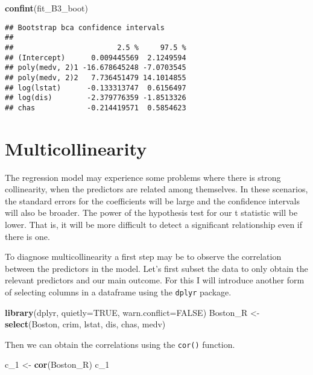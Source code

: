 \documentclass[
]{book}
\newenvironment{Shaded}{\begin{snugshade}}{\end{snugshade}}
\newcommand{\AttributeTok}[1]{\textcolor[rgb]{0.13,0.29,0.53}{#1}}
\newcommand{\ConstantTok}[1]{\textcolor[rgb]{0.56,0.35,0.01}{#1}}
\newcommand{\FunctionTok}[1]{\textcolor[rgb]{0.13,0.29,0.53}{\textbf{#1}}}
\newcommand{\NormalTok}[1]{#1}
\newcommand{\OtherTok}[1]{\textcolor[rgb]{0.56,0.35,0.01}{#1}}
\begin{document}
\begin{Shaded}
\begin{Highlighting}[]
\FunctionTok{confint}\NormalTok{(fit\_B3\_boot)}
\end{Highlighting}
\end{Shaded}

\begin{verbatim}
## Bootstrap bca confidence intervals
## 
##                        2.5 %     97.5 %
## (Intercept)      0.009445569  2.1249594
## poly(medv, 2)1 -16.678645248 -7.0703545
## poly(medv, 2)2   7.736451479 14.1014855
## log(lstat)      -0.133313747  0.6156497
## log(dis)        -2.379776359 -1.8513326
## chas            -0.214419571  0.5854623
\end{verbatim}

\section{Multicollinearity}\label{multicollinearity}

The regression model may experience some problems where there is strong collinearity, when the predictors are related among themselves. In these scenarios, the standard errors for the coefficients will be large and the confidence intervals will also be broader. The power of the hypothesis test for our t statistic will be lower. That is, it will be more difficult to detect a significant relationship even if there is one.

To diagnose multicollinearity a first step may be to observe the correlation between the predictors in the model. Let's first subset the data to only obtain the relevant predictors and our main outcome. For this I will introduce another form of selecting columns in a dataframe using the \texttt{dplyr} package.

\begin{Shaded}
\begin{Highlighting}[]
\FunctionTok{library}\NormalTok{(dplyr, }\AttributeTok{quietly=}\ConstantTok{TRUE}\NormalTok{, }\AttributeTok{warn.conflict=}\ConstantTok{FALSE}\NormalTok{)}
\NormalTok{Boston\_R }\OtherTok{\textless{}{-}} \FunctionTok{select}\NormalTok{(Boston, crim, lstat, dis, chas, medv)}
\end{Highlighting}
\end{Shaded}

Then we can obtain the correlations using the \texttt{cor()} function.

\begin{Shaded}
\begin{Highlighting}[]
\NormalTok{c\_1 }\OtherTok{\textless{}{-}} \FunctionTok{cor}\NormalTok{(Boston\_R)}
\NormalTok{c\_1}
\end{Highlighting}
\end{Shaded}
\end{document}
